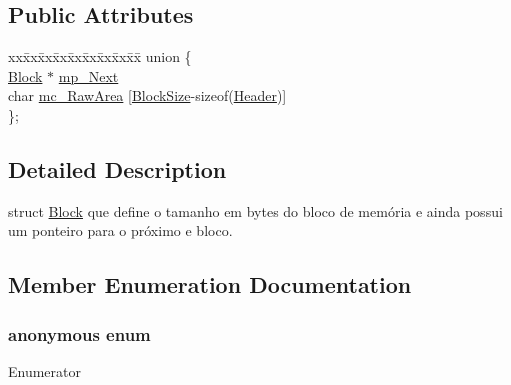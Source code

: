 \subsection*{Public Attributes}
\begin{DoxyCompactItemize}
\item 
\begin{tabbing}
xx\=xx\=xx\=xx\=xx\=xx\=xx\=xx\=xx\=\kill
union \{\\
\>\hyperlink{struct_s_l_pool_1_1_block}{Block} $\ast$ \hyperlink{struct_s_l_pool_1_1_block_ac626694affad2d9cdb8c93764d151225}{mp\_Next}\\
\>char \hyperlink{struct_s_l_pool_1_1_block_a5fcd86a9b213418deea8c65571290fbd}{mc\_RawArea} \mbox{[}\hyperlink{struct_s_l_pool_1_1_block_adbb416e65dd0d7aa2121e30b34424db8a32fd11caed7c39eb5ab3949a612a14b9}{BlockSize}-\/sizeof(\hyperlink{struct_s_l_pool_1_1_header}{Header})\mbox{]}\\
\}; \\

\end{tabbing}\end{DoxyCompactItemize}


\subsection{Detailed Description}
struct \hyperlink{struct_s_l_pool_1_1_block}{Block} que define o tamanho em bytes do bloco de memória e ainda possui um ponteiro para o próximo e bloco. 

\subsection{Member Enumeration Documentation}
\subsubsection[{\texorpdfstring{anonymous enum}{anonymous enum}}]{\setlength{\rightskip}{0pt plus 5cm}anonymous enum}\hypertarget{struct_s_l_pool_1_1_block_adbb416e65dd0d7aa2121e30b34424db8}{}\label{struct_s_l_pool_1_1_block_adbb416e65dd0d7aa2121e30b34424db8}
\begin{Desc}
\item[Enumerator]\par
\begin{description}
\item[{\em 
Block\+Size\hypertarget{struct_s_l_pool_1_1_block_adbb416e65dd0d7aa2121e30b34424db8a32fd11caed7c39eb5ab3949a612a14b9}{}\label{struct_s_l_pool_1_1_block_adbb416e65dd0d7aa2121e30b34424db8a32fd11caed7c39eb5ab3949a612a14b9}
}]\end{description}
\end{Desc}


